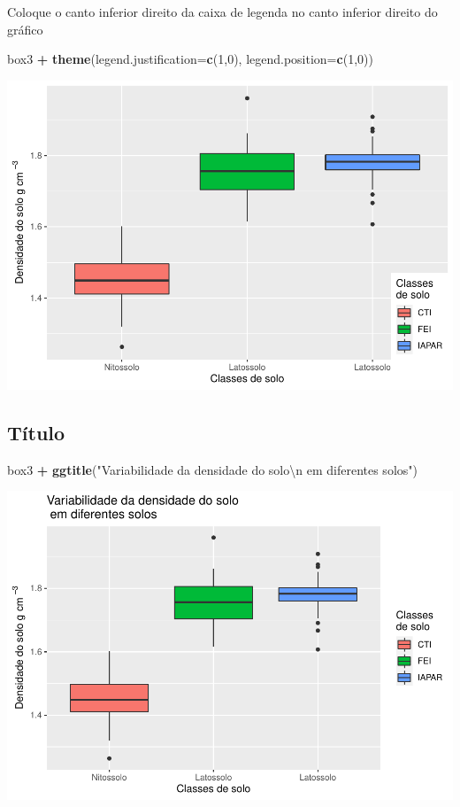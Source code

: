 \documentclass[
]{book}
\newenvironment{Shaded}{\begin{snugshade}}{\end{snugshade}}
\newcommand{\CharTok}[1]{\textcolor[rgb]{0.31,0.60,0.02}{#1}}
\newcommand{\DataTypeTok}[1]{\textcolor[rgb]{0.13,0.29,0.53}{#1}}
\newcommand{\DecValTok}[1]{\textcolor[rgb]{0.00,0.00,0.81}{#1}}
\newcommand{\KeywordTok}[1]{\textcolor[rgb]{0.13,0.29,0.53}{\textbf{#1}}}
\newcommand{\NormalTok}[1]{#1}
\newcommand{\OperatorTok}[1]{\textcolor[rgb]{0.81,0.36,0.00}{\textbf{#1}}}
\newcommand{\StringTok}[1]{\textcolor[rgb]{0.31,0.60,0.02}{#1}}
\begin{document}
Coloque o canto inferior direito da caixa de legenda no canto inferior direito do gráfico

\begin{Shaded}
\begin{Highlighting}[]
\NormalTok{box3 }\OperatorTok{+}\StringTok{ }\KeywordTok{theme}\NormalTok{(}\DataTypeTok{legend.justification=}\KeywordTok{c}\NormalTok{(}\DecValTok{1}\NormalTok{,}\DecValTok{0}\NormalTok{), }\DataTypeTok{legend.position=}\KeywordTok{c}\NormalTok{(}\DecValTok{1}\NormalTok{,}\DecValTok{0}\NormalTok{))}
\end{Highlighting}
\end{Shaded}

\includegraphics{TudodoR_files/figure-latex/unnamed-chunk-218-1.pdf}

\hypertarget{tuxedtulo}{%
\subsection{Título}\label{tuxedtulo}}

\begin{Shaded}
\begin{Highlighting}[]
\NormalTok{box3 }\OperatorTok{+}\StringTok{ }\KeywordTok{ggtitle}\NormalTok{(}\StringTok{"Variabilidade da densidade do solo}\CharTok{\textbackslash{}n}\StringTok{ em diferentes solos"}\NormalTok{)}
\end{Highlighting}
\end{Shaded}

\includegraphics{TudodoR_files/figure-latex/unnamed-chunk-219-1.pdf}
\end{document}
